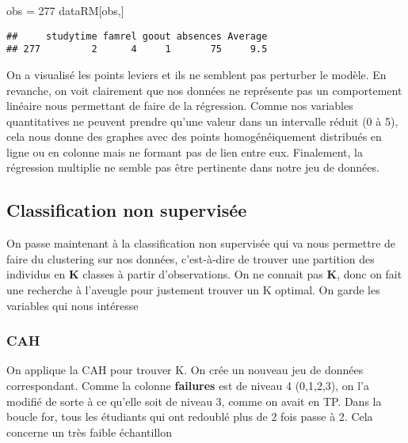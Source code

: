 \documentclass[
]{article}
\newenvironment{Shaded}{\begin{snugshade}}{\end{snugshade}}
\newcommand{\DecValTok}[1]{\textcolor[rgb]{0.00,0.00,0.81}{#1}}
\newcommand{\NormalTok}[1]{#1}
\newcommand{\OtherTok}[1]{\textcolor[rgb]{0.56,0.35,0.01}{#1}}
\begin{document}
\begin{Shaded}
\begin{Highlighting}[]
\NormalTok{obs }\OtherTok{=} \DecValTok{277}
\NormalTok{dataRM[obs,]  }
\end{Highlighting}
\end{Shaded}

\begin{verbatim}
##     studytime famrel goout absences Average
## 277         2      4     1       75     9.5
\end{verbatim}

On a visualisé les points leviers et ils ne semblent pas perturber le
modèle. En revanche, on voit clairement que nos données ne représente
pas un comportement linéaire nous permettant de faire de la régression.
Comme nos variables quantitatives ne peuvent prendre qu'une valeur dans
un intervalle réduit (0 à 5), cela nous donne des graphes avec des
points homogénéiquement distribués en ligne ou en colonne mais ne
formant pas de lien entre eux. Finalement, la régression multiplie ne
semble pas être pertinente dans notre jeu de données.

\hypertarget{classification-non-supervisuxe9e}{%
\subsection{Classification non
supervisée}\label{classification-non-supervisuxe9e}}

On passe maintenant à la classification non supervisée qui va nous
permettre de faire du clustering sur nos données, c'est-à-dire de
trouver une partition des individus en \textbf{K} classes à partir
d'observations. On ne connait pas \textbf{K}, donc on fait une recherche
à l'aveugle pour justement trouver un K optimal. On garde les variables
qui nous intéresse

\hypertarget{cah}{%
\subsubsection{CAH}\label{cah}}

On applique la CAH pour trouver K. On crée un nouveau jeu de données
correspondant. Comme la colonne \textbf{failures} est de niveau 4
(0,1,2,3), on l'a modifié de sorte à ce qu'elle soit de niveau 3, comme
on avait en TP. Dans la boucle for, tous les étudiants qui ont redoublé
plus de 2 fois passe à 2. Cela concerne un très faible échantillon
\end{document}
